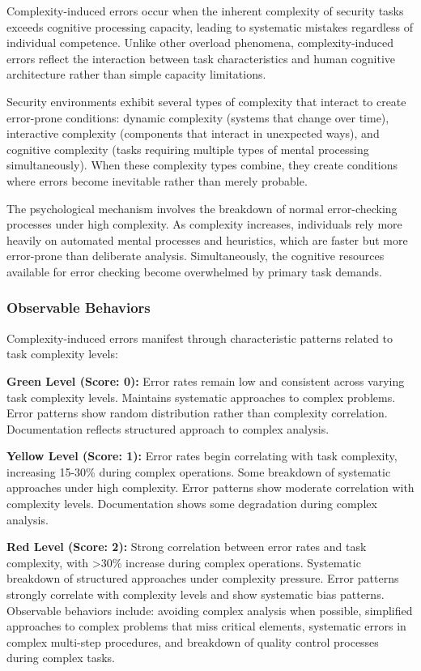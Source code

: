 \documentclass[11pt,a4paper]{article}
\begin{document}
Complexity-induced errors occur when the inherent complexity of security tasks exceeds cognitive processing capacity, leading to systematic mistakes regardless of individual competence\cite{woods2010}. Unlike other overload phenomena, complexity-induced errors reflect the interaction between task characteristics and human cognitive architecture rather than simple capacity limitations.

Security environments exhibit several types of complexity that interact to create error-prone conditions: dynamic complexity (systems that change over time), interactive complexity (components that interact in unexpected ways), and cognitive complexity (tasks requiring multiple types of mental processing simultaneously)\cite{perrow1984}. When these complexity types combine, they create conditions where errors become inevitable rather than merely probable.

The psychological mechanism involves the breakdown of normal error-checking processes under high complexity\cite{reason1990}. As complexity increases, individuals rely more heavily on automated mental processes and heuristics, which are faster but more error-prone than deliberate analysis. Simultaneously, the cognitive resources available for error checking become overwhelmed by primary task demands.

\subsubsection{Observable Behaviors}

Complexity-induced errors manifest through characteristic patterns related to task complexity levels:

\textbf{Green Level (Score: 0):} Error rates remain low and consistent across varying task complexity levels. Maintains systematic approaches to complex problems. Error patterns show random distribution rather than complexity correlation. Documentation reflects structured approach to complex analysis.

\textbf{Yellow Level (Score: 1):} Error rates begin correlating with task complexity, increasing 15-30\% during complex operations. Some breakdown of systematic approaches under high complexity. Error patterns show moderate correlation with complexity levels. Documentation shows some degradation during complex analysis.

\textbf{Red Level (Score: 2):} Strong correlation between error rates and task complexity, with >30\% increase during complex operations. Systematic breakdown of structured approaches under complexity pressure. Error patterns strongly correlate with complexity levels and show systematic bias patterns. Observable behaviors include: avoiding complex analysis when possible, simplified approaches to complex problems that miss critical elements, systematic errors in complex multi-step procedures, and breakdown of quality control processes during complex tasks.
\end{document}
